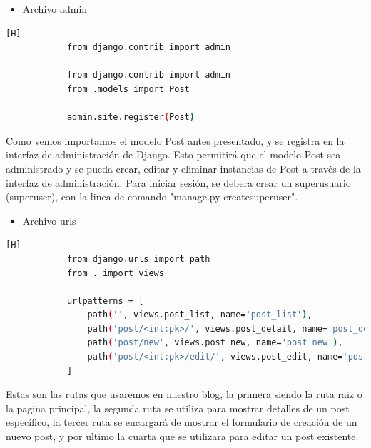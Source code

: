 \documentclass{article}
\begin{document}
        \begin{itemize}	
    		\item Archivo admin
        \end{itemize}
        
        \begin{lstlisting}[language=bash,caption={admin.py}][H]
            from django.contrib import admin

            from django.contrib import admin
            from .models import Post
            
            admin.site.register(Post)
	\end{lstlisting}
    Como vemos importamos el modelo Post antes presentado, y se registra en la interfaz de administración de Django. Esto permitirá que el modelo Post sea administrado y se pueda crear, editar y eliminar instancias de Post a través de la interfaz de administración. Para iniciar sesión, se debera crear un superusuario (superuser), con la linea de comando "manage.py createsuperuser".

        \begin{itemize}	
    		\item Archivo urls
        \end{itemize}
        
        \begin{lstlisting}[language=bash,caption={urls.py}][H] 
            from django.urls import path
            from . import views
            
            urlpatterns = [
                path('', views.post_list, name='post_list'),
                path('post/<int:pk>/', views.post_detail, name='post_detail'),
                path('post/new', views.post_new, name='post_new'),
                path('post/<int:pk>/edit/', views.post_edit, name='post_edit'),
            ]
	\end{lstlisting}
    Estas son las rutas que usaremos en nuestro blog, la primera siendo la ruta raiz o la pagina principal, la segunda ruta se utiliza para mostrar detalles de un post específico, la tercer ruta se encargará de mostrar el formulario de creación de un nuevo post, y por ultimo la cuarta que se utilizara  para editar un post existente.
\end{document}
